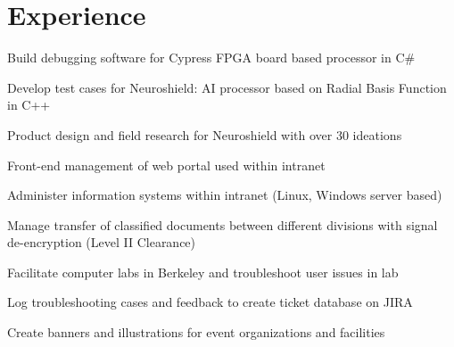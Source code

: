 \documentclass[]{deedy-resume-openfont}
\begin{document}
\hfill
\begin{minipage}[t]{0.66\textwidth} 


\section{Experience}

 \descript{|}
\vspace{\topsep}
\begin{tightemize}
\item Build debugging software for Cypress FPGA board based processor in C\# 
\item Develop test cases for Neuroshield: AI processor based on Radial Basis Function in C++
\item Product design and field research for Neuroshield with over 30 ideations
\end{tightemize}
\sectionsep

 \descript{|}
\begin{tightemize}
\item Front-end management of web portal used within intranet
\item Administer information systems within intranet (Linux, Windows server based)
\item Manage transfer of classified documents between different divisions with signal de-encryption (Level II Clearance)
\end{tightemize}
\sectionsep

 \descript{|}
\begin{tightemize}
\item Facilitate computer labs in Berkeley and troubleshoot user issues in lab
\item Log troubleshooting cases and feedback to create ticket database on JIRA
\item Create banners and illustrations for event organizations and facilities
\end{tightemize}
\sectionsep

\end{minipage}
\end{document}
